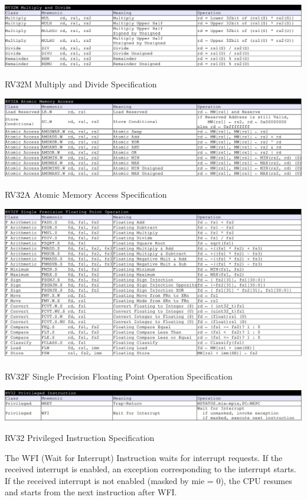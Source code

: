 \begin{table}[H]
    \includegraphics[width=1.00\columnwidth]{./Table/ISASpec_RV32M.png}
    \caption{RV32M Multiply and Divide Specification}
    \label{tb:ISASpec_RV32M}
\end{table}

\begin{table}[H]
    \includegraphics[width=1.00\columnwidth]{./Table/ISASpec_RV32A.png}
    \caption{RV32A Atomic Memory Access Specification}
    \label{tb:ISASpec_RV32A}
\end{table}

\begin{table}[H]
    \includegraphics[width=1.00\columnwidth]{./Table/ISASpec_RV32F.png}
    \caption{RV32F Single Precision Floating Point Operation Specification}
    \label{tb:ISASpec_RV32F}
\end{table}

\begin{table}[H]
    \includegraphics[width=1.00\columnwidth]{./Table/ISASpec_RV32Priviledged.png}
    \caption{RV32 Privileged Instruction Specification}
    \label{tb:ISASpec_RV32Priviledged}
\end{table}

The WFI (Wait for Interrupt) Instruction waits for interrupt requests. If the received interrupt is enabled, an exception corresponding to the interrupt starts. If the received interrupt is not enabled (masked by mie = 0), the CPU resumes and starts from the next instruction after WFI.





